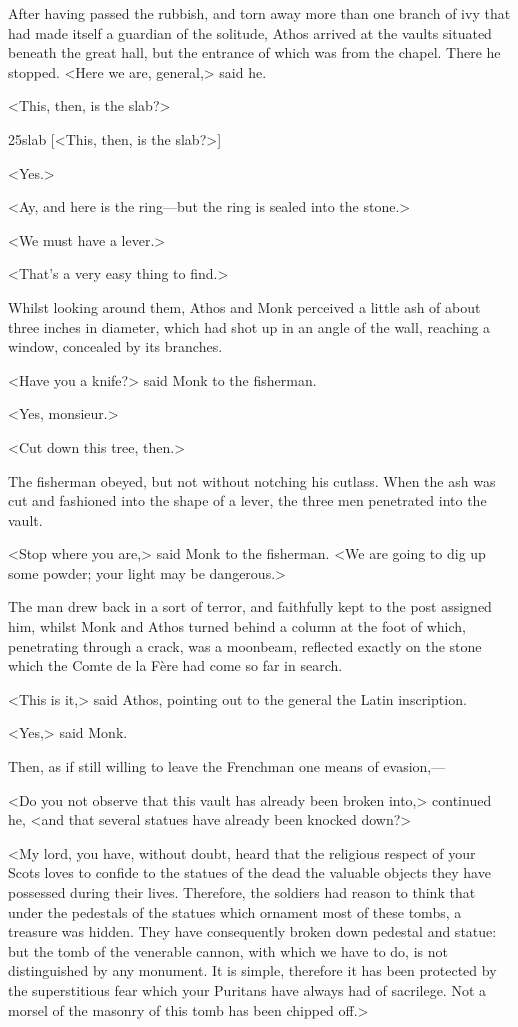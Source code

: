 After having passed the rubbish, and torn away more than one branch of ivy that had made itself a guardian of the solitude, Athos arrived at the vaults situated beneath the great hall, but the entrance of which was from the chapel. There he stopped. <Here we are, general,> said he.

<This, then, is the slab?>

\begin{bwbigpic}
	[\basicscale] 
	{25slab}
	[<This, then, is the slab?>]
\end{bwbigpic}

<Yes.>

<Ay, and here is the ring—but the ring is sealed into the stone.>

<We must have a lever.>

<That's a very easy thing to find.>

Whilst looking around them, Athos and Monk perceived a little ash of about three inches in diameter, which had shot up in an angle of the wall, reaching a window, concealed by its branches.

<Have you a knife?> said Monk to the fisherman.

<Yes, monsieur.>

<Cut down this tree, then.>

The fisherman obeyed, but not without notching his cutlass. When the ash was cut and fashioned into the shape of a lever, the three men penetrated into the vault.

<Stop where you are,> said Monk to the fisherman. <We are going to dig up some powder; your light may be dangerous.>

The man drew back in a sort of terror, and faithfully kept to the post assigned him, whilst Monk and Athos turned behind a column at the foot of which, penetrating through a crack, was a moonbeam, reflected exactly on the stone which the Comte de la Fère had come so far in search.

<This is it,> said Athos, pointing out to the general the Latin inscription.

<Yes,> said Monk.

Then, as if still willing to leave the Frenchman one means of evasion,—

<Do you not observe that this vault has already been broken into,> continued he, <and that several statues have already been knocked down?>

<My lord, you have, without doubt, heard that the religious respect of your Scots loves to confide to the statues of the dead the valuable objects they have possessed during their lives. Therefore, the soldiers had reason to think that under the pedestals of the statues which ornament most of these tombs, a treasure was hidden. They have consequently broken down pedestal and statue: but the tomb of the venerable cannon, with which we have to do, is not distinguished by any monument. It is simple, therefore it has been protected by the superstitious fear which your Puritans have always had of sacrilege. Not a morsel of the masonry of this tomb has been chipped off.>

